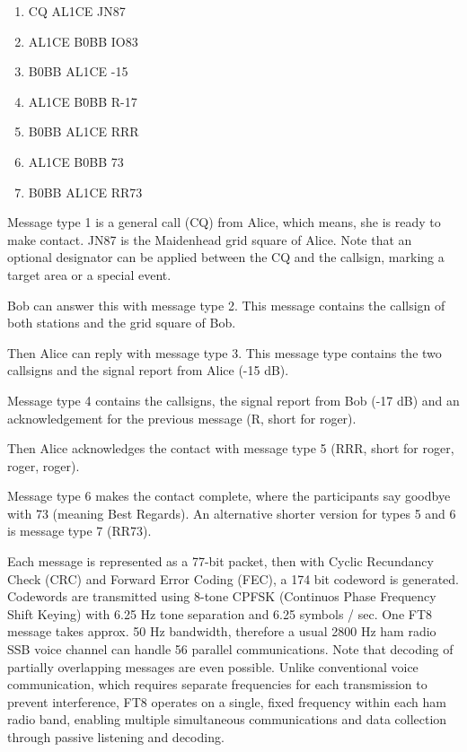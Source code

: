 \documentclass[signals,article,submit,pdftex,moreauthors]{Definitions/mdpi}
\begin{document}
\begin{enumerate}

  \item{CQ AL1CE JN87}    %

  \item{AL1CE B0BB IO83}  %

  \item{B0BB AL1CE -15}   %

  \item{AL1CE B0BB R-17}  %

  \item{B0BB AL1CE RRR}   %

  \item{AL1CE B0BB 73}    %

  \item{B0BB AL1CE RR73}  %
  

\end{enumerate}

Message type 1 is a general call (CQ) from Alice, which means, she is ready to
make contact. JN87 is the Maidenhead grid square of Alice. Note that an optional designator can be applied between the CQ and the callsign,
marking a target area or a special event.

Bob can answer this with message type 2. This message contains the callsign of both stations and the grid square of Bob.

Then Alice can reply with message type 3. This message type contains the two callsigns and the signal report from Alice (-15 dB).

Message type 4 contains the callsigns, the signal report from Bob (-17 dB) and an acknowledgement for the previous message
(R, short for roger).

Then Alice acknowledges the contact with message type 5 (RRR, short for roger, roger, roger).

Message type 6 makes the contact complete, where the participants say goodbye with 73 (meaning Best Regards). An alternative
shorter version for types 5 and 6 is message type 7 (RR73).

Each message is represented as a 77-bit packet, then with Cyclic Recundancy Check (CRC) and Forward Error Coding (FEC), a 174 bit
codeword is generated. Codewords are transmitted using 8-tone CPFSK (Continuos Phase Frequency Shift Keying) with 6.25 Hz tone separation
and 6.25 symbols / sec. One FT8 message takes approx. 50 Hz bandwidth, therefore a usual 2800 Hz ham radio SSB voice channel can handle
56 parallel communications. Note that decoding of partially overlapping messages are even possible.
Unlike conventional voice communication, which requires separate frequencies for each transmission to prevent interference,
FT8 operates on a single, fixed frequency within each ham radio band, enabling multiple simultaneous communications
and data collection through passive listening and decoding.
\end{document}
